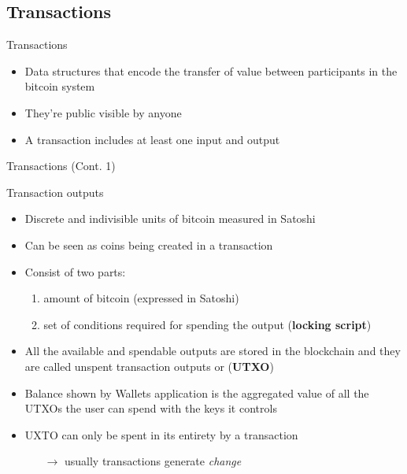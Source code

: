 \documentclass{beamer}
\begin{document}
  \subsection{Transactions}
  \begin{frame}{Transactions}
    \begin{itemize}
      \item Data structures that encode the transfer of value between participants
      in the bitcoin system 
      \item They're public visible by anyone 
      \item A transaction includes at least one input and output
    \end{itemize}
  \end{frame}





  \begin{frame}{Transactions (Cont. 1)}
    \begin{block}{Transaction outputs}
      \begin{itemize}
        \item Discrete and indivisible units of bitcoin measured in Satoshi 
        \item Can be seen as coins being created in a transaction \pause 
        \item Consist of two parts:
        \begin{enumerate}
          \item amount of bitcoin (expressed in Satoshi)
          \item set of conditions required for spending the output (\textbf{locking script})
        \end{enumerate}
        \pause
        \item All the available and spendable outputs are stored in the blockchain
        and they are called unspent transaction outputs or (\textbf{UTXO}) 
        \item Balance shown by Wallets application is the aggregated value of
        all the UTXOs the user can spend with the keys it controls 
        \item UXTO can only be spent in its entirety by a transaction \pause
        \begin{itemize}
          \item[$\rightarrow$] usually transactions generate \emph{change}
        \end{itemize}
      \end{itemize}
    \end{block}
  \end{frame}
\end{document}
